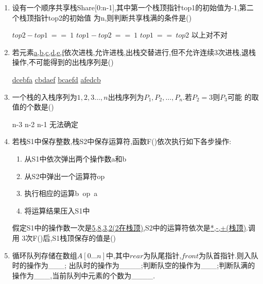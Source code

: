 \documentclass[12pt, a4paper, oneside, UTF8]{ctexbook}
\begin{document}
\begin{enumerate}
    \item 设有一个顺序共享栈Share[0:n-1],其中第一个栈顶指针top1的初始值为-1,第二个栈顶指针top2的初始值
    为n,则判断共享栈满的条件是() 
    \begin{choices}[2]
        \task $top2-top1\ ==\ 1$
        \task $top1-top2\ ==\ 1$ 
        \task $top1\ ==\ top2$ 
        \task 以上对不对
    \end{choices}


    \item \bl 若元素\underline{a,b,c,d,e,f}依次进栈,允许进栈,出栈交替进行,但不允许连续3次进栈,退栈
    操作,不可能得到的出栈序列是() 
    \begin{choices}
        \task \underline{dcebfa}
        \task \underline{cbdaef}
        \task \underline{bcaefd}
        \task \underline{afedcb} 
    \end{choices}



    \item \bl 一个栈的入栈序列为\underline{$1,2,3\ldots,n$}出栈序列为$P_1,P_2,\ldots,P_n$.若$P_2=3$则$P_3$可能 
    的取值的个数是() 
    \begin{choices}
        \task n-3
        \task n-2
        \task n-1
        \task 无法确定 
    \end{choices}


    \item \bl 若栈S1中保存整数,栈S2中保存运算符,函数F()依次执行如下各步操作: 
    \begin{enumerate}[label= (\arabic*)]
        \item 从S1中依次弹出两个操作数a和b
        \item 从S2中弹出一个运算符op
        \item 执行相应的运算b\ op\ a 
        \item 将运算结果压入S1中 
    \end{enumerate}
    假定S1中的操作数一次是\underline{5,8,3,2(2在栈顶)},S2中的运算符依次是\underline{*,-,+(栈顶)}.调用
    3次F()后,S1栈顶保存的值是() 
    \begin{choices}
    \end{choices}


    \item 循环队列存储在数组$A[0\ldots n]$中,其中$rear$为队尾指针,$front$为队首指针.则入队时的操作为\_\_\_;
    出队时的操作为\_\_\_\_;判断队空的操作为\_\_\_;判断队满的操作为\_\_\_,当前队列中元素的个数为\_\_\_\_. 





\end{enumerate}
\end{document}
